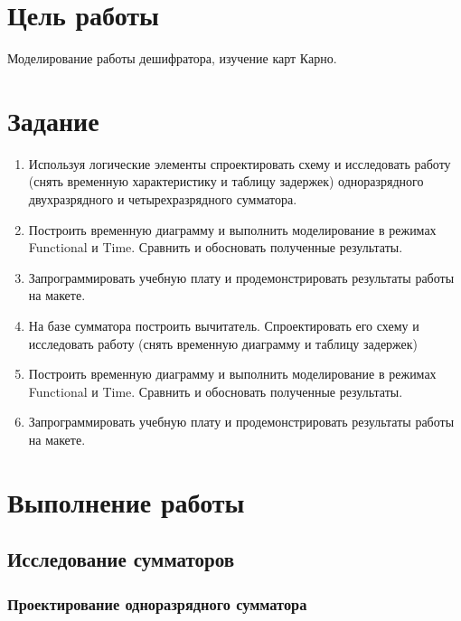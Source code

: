 \documentclass[a4paper,14pt]{article}
\begin{document}

\tableofcontents
\pagebreak

\section{Цель работы}

Моделирование работы дешифратора, изучение карт Карно.

\section{Задание}

\begin{enumerate}
\item Используя логические элементы спроектировать схему и исследовать работу (снять временную характеристику и таблицу задержек) одноразрядного двухразрядного и четырехразрядного сумматора.

\item Построить временную диаграмму и выполнить моделирование в режимах Functional и Time. Сравнить и обосновать полученные результаты.

\item Запрограммировать учебную плату и продемонстрировать результаты работы на макете.

\item На базе сумматора построить вычитатель. Спроектировать его схему и исследовать работу (снять временную диаграмму и таблицу задержек)

\item Построить временную диаграмму и выполнить моделирование в режимах Functional и Time. Сравнить и обосновать полученные результаты.

\item Запрограммировать учебную плату и продемонстрировать результаты работы на макете.
\end{enumerate}

\section{Выполнение работы}

\subsection{Исследование сумматоров}

\subsubsection{Проектирование одноразрядного сумматора}
\end{document}
